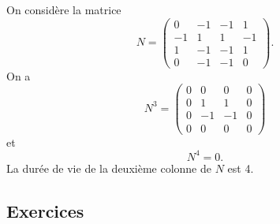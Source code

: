 \begin{example}
  \label{exe:57}

  On considère la matrice
  \begin{displaymath}
    N =  \left(\begin{array}{rrrr}
0 & -1 & -1 & 1 \\
-1 & 1 & 1 & -1 \\
1 & -1 & -1 & 1 \\
0 & -1 & -1 & 0
\end{array}\right).  
\end{displaymath}
On a
\begin{displaymath}
  N^3 = \left(\begin{array}{rrrr}
0 & 0 & 0 & 0 \\
0 & 1 & 1 & 0 \\
0 & -1 & -1 & 0 \\
0 & 0 & 0 & 0
\end{array}\right) 
\end{displaymath}
et
\begin{displaymath}
  N^4 = 0. 
\end{displaymath}
La durée de vie de la deuxième colonne de  $N$ est 4. 
\end{example}



\subsection*{Exercices} 

